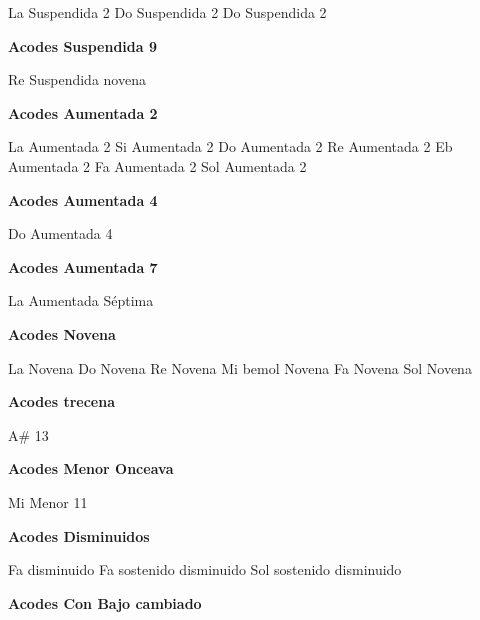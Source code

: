 \small
\upchord{\AsustwoGuitar}La Suspendida 2
\upchord{\CsustwoGuitar}Do Suspendida 2
\upchord{\DsustwoGuitar}Do Suspendida 2
\normalsize

\vskip 20pt
\textbf{Acodes Suspendida 9}
\vskip 25pt

\small
\upchord{\DsusnineGuitar}Re Suspendida novena
\normalsize

\vskip 20pt
\textbf{Acodes Aumentada 2}
\vskip 25pt

\small
\upchord{\AtwoGuitar}La Aumentada 2 \hfill
\upchord{\BtwoGuitar}Si Aumentada 2 \hfill
\upchord{\CtwoGuitar}Do Aumentada 2 \hfill
\upchord{\DtwoGuitar}Re Aumentada 2 \hfill\null\break
\vskip 20pt
\upchord{\EflattwoGuitar}Eb Aumentada 2 \hfill
\upchord{\FtwoGuitar}Fa Aumentada 2 \hfill
\upchord{\GtwoGuitar}Sol Aumentada 2 \hfill\null\break
\normalsize

\vskip 20pt
\textbf{Acodes Aumentada 4}
\vskip 25pt

\small
\upchord{\CfourGuitar}Do Aumentada 4 \hfill\null\break
\normalsize

\vskip 20pt
\textbf{Acodes Aumentada 7}
\vskip 25pt

\small
\upchord{\AaugsevenGuitar}La Aumentada S\'eptima \hfill\null\break
\normalsize

\vskip 20pt
\textbf{Acodes Novena}
\vskip 25pt

\small
\upchord{\AnineGuitar}La Novena \hfill
\upchord{\CnineGuitar}Do Novena \hfill
\upchord{\DnineGuitar}Re Novena \hfill
\upchord{\EflatnineGuitar}Mi bemol Novena \hfill\null\break
\upchord{\FnineGuitar}Fa Novena \hfill
\upchord{\GnineGuitar}Sol Novena \hfill\null\break
\normalsize

\vskip 20pt
\textbf{Acodes trecena}
\vskip 25pt

\small
\upchord{\AsthirteenGuitar}A\# 13
\normalsize

\vskip 20pt
\textbf{Acodes Menor Onceava}
\vskip 25pt

\small
\upchord{\EmelevenGuitar}Mi Menor 11
\normalsize

\vskip 20pt
\textbf{Acodes Disminuidos}
\vskip 25pt

\small
\upchord{\FdimGuitar}Fa disminuido \hfill
\upchord{\FsdimGuitar}Fa sostenido disminuido \hfill
\upchord{\GsdimGuitar}Sol sostenido disminuido \hfill\null\break
\normalsize


\vskip 20pt
\textbf{Acodes Con Bajo cambiado}

